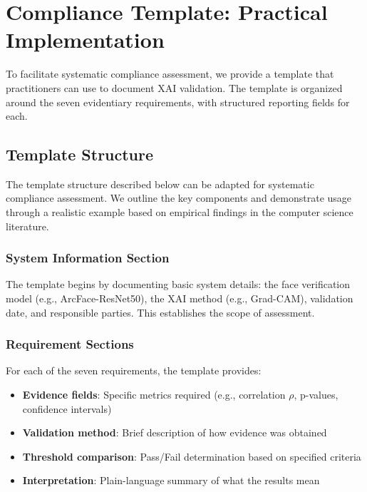 \section{Compliance Template: Practical Implementation}

To facilitate systematic compliance assessment, we provide a template that practitioners can use to document XAI validation. The template is organized around the seven evidentiary requirements, with structured reporting fields for each.

\subsection{Template Structure}

The template structure described below can be adapted for systematic compliance assessment. We outline the key components and demonstrate usage through a realistic example based on empirical findings in the computer science literature.

\subsubsection{System Information Section}

The template begins by documenting basic system details: the face verification model (e.g., ArcFace-ResNet50), the XAI method (e.g., Grad-CAM), validation date, and responsible parties. This establishes the scope of assessment.

\subsubsection{Requirement Sections}

For each of the seven requirements, the template provides:

\begin{itemize}[itemsep=2pt]
    \item \textbf{Evidence fields}: Specific metrics required (e.g., correlation $\rho$, p-values, confidence intervals)
    \item \textbf{Validation method}: Brief description of how evidence was obtained
    \item \textbf{Threshold comparison}: Pass/Fail determination based on specified criteria
    \item \textbf{Interpretation}: Plain-language summary of what the results mean
\end{itemize}

